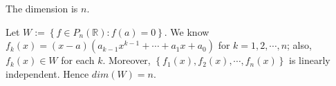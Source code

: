 \begin{Exercise}
\begin{answer}
The dimension is $n$.
\end{answer}
\begin{solution}
Let $W := \left\{ f\in P_n(\mathbb{R}): f(a) = 0 \right\}$. We know $f_k(x) = (x-a)(a_{k-1}x^{k-1}+\cdots+a_1 x+a_0)$ for $k=1,2,\cdots,n$; also, $f_k(x)\in W$ for each $k$. Moreover, $\left\{ f_1(x), f_2(x), \cdots, f_n(x) \right\}$ is linearly independent. Hence $dim(W) = n$.
\end{solution}
\end{Exercise}